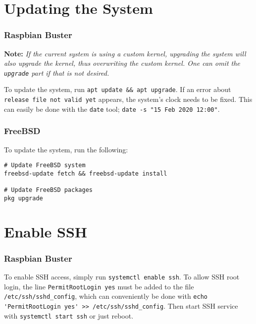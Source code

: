 \section{Updating the System} \label{update_system}


\subsubsection{Raspbian Buster}

\textbf{Note:} \textit{If the current system is using a custom kernel, upgrading the system will also upgrade the kernel, thus overwriting the custom kernel. One can omit the \lstinline{upgrade} part if that is not desired.}

To update the system, run \lstinline{apt update && apt upgrade}. If an error about \lstinline{release file not valid yet} appears, the system's clock needs to be fixed. This can easily be done with the \lstinline{date} tool; \lstinline{date -s "15 Feb 2020 12:00"}.


\subsubsection{FreeBSD}

To update the system, run the following:

\begin{verbatim}
# Update FreeBSD system
freebsd-update fetch && freebsd-update install

# Update FreeBSD packages
pkg upgrade
\end{verbatim}









\section{Enable SSH} \label{enable_ssh}

\subsubsection{Raspbian Buster}

To enable SSH access, simply run \lstinline{systemctl enable ssh}. To allow SSH root login, the line \lstinline{PermitRootLogin yes} must be added to the file \lstinline{/etc/ssh/sshd_config}, which can conveniently be done with \lstinline{echo 'PermitRootLogin yes' >> /etc/ssh/sshd_config}. Then start SSH service with \lstinline{systemctl start ssh} or just reboot.


